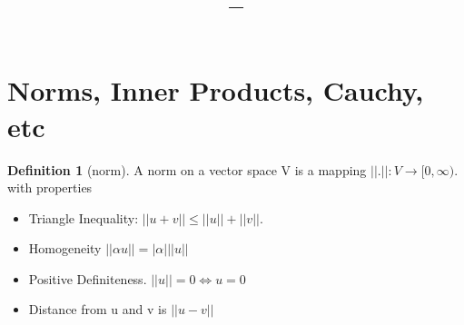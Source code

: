 \documentclass[11pt]{article}
\title{\vspace{-1.5em}\textbf{\coursename -- \lecturetitle}}
\author{\studentname}
\date{\lecturedate}
\newcommand{\1}{\mathbf{1}}
\theoremstyle{notestyle}
\theoremstyle{definition}
\newtheorem{definition}[theorem]{Definition}
\begin{document}
\maketitle

\section{Norms, Inner Products, Cauchy, etc}
\begin{definition}[norm]
\label{def:label}
A norm on a vector space V is a mapping $||. || : V \rightarrow [0, \infty).$
with properties 
\begin{itemize}
    \item Triangle Inequality: $||u + v|| \le ||u|| + ||v||.$
    \item Homogeneity $||\alpha u|| = |\alpha| ||u||$
    \item Positive Definiteness. $||u|| = 0 \iff u = 0$
    \item Distance from u and v is $||u-v||$
\end{itemize}
\end{definition}
\end{document}
